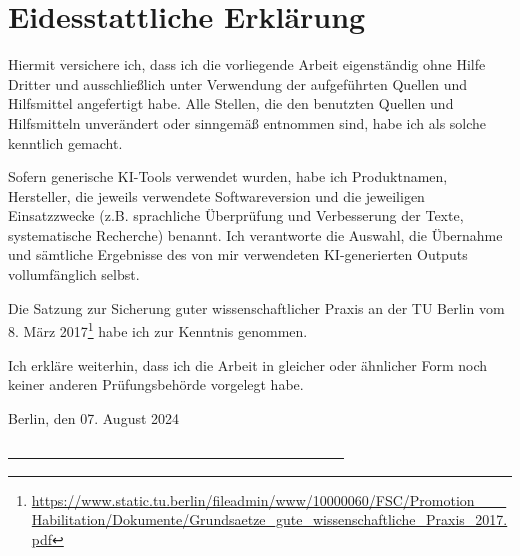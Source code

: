 \section*{Eidesstattliche Erklärung}

Hiermit versichere ich, dass ich die vorliegende Arbeit eigenständig ohne Hilfe Dritter und ausschließlich unter Verwendung der aufgeführten Quellen und Hilfsmittel angefertigt habe. Alle Stellen, die den benutzten Quellen und Hilfsmitteln unverändert oder sinngemäß entnommen sind, habe ich als solche kenntlich gemacht.

Sofern generische KI-Tools verwendet wurden, habe ich Produktnamen, Hersteller, die jeweils verwendete Softwareversion und die jeweiligen Einsatzzwecke (z.B. sprachliche Überprüfung und Verbesserung der Texte, systematische Recherche) benannt. Ich verantworte die Auswahl, die Übernahme und sämtliche Ergebnisse des von mir verwendeten KI-generierten Outputs vollumfänglich selbst.

Die Satzung zur Sicherung guter wissenschaftlicher Praxis an der TU Berlin vom 8. März 2017\footnote{\url{https://www.static.tu.berlin/fileadmin/www/10000060/FSC/Promotion___Habilitation/Dokumente/Grundsaetze_gute_wissenschaftliche_Praxis_2017.pdf}} habe ich zur Kenntnis genommen. 

Ich erkläre weiterhin, dass ich die Arbeit in gleicher oder ähnlicher Form noch keiner anderen Prüfungsbehörde vorgelegt habe.

\vspace{1cm}
Berlin, den 07. August 2024
\begin{center}
\vspace{-1cm}
\hspace{1.5cm}
\underline{~~~~~~~~~~~~~~~~~~~~~~~~~~~~~~~~~~~~~~~~~~~~~~~~}
\end{center}